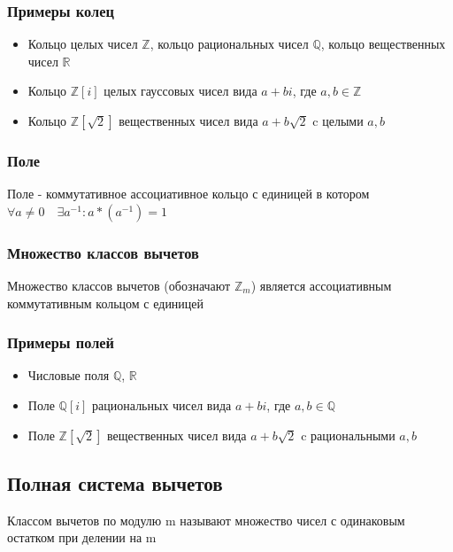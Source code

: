 \documentclass[12pt]{article}
\begin{document}
            \subsubsection{Примеры колец}
            \begin{itemize}
                \item Кольцо целых чисел $\mathbb{Z}$, кольцо рациональных чисел $\mathbb{Q}$, кольцо вещественных чисел $\mathbb{R}$
                \item Кольцо $\mathbb{Z}[i]$ целых гауссовых чисел вида $a + bi$, где $a,b \in \mathbb{Z}$
                \item Кольцо $\mathbb{Z}[\sqrt{2}]$ вещественных чисел вида $a + b\sqrt{2}$ c целыми $a,b$
            \end{itemize}

            \subsubsection{Поле}
            Поле - коммутативное ассоциативное кольцо с единицей в котором $\forall a \ne 0 \quad \exists a^{-1}: a * (a^{-1}) = 1$

            \subsubsection{Множество классов вычетов}
            Множество классов вычетов (обозначают $\mathbb{Z}_m$) является ассоциативным коммутативным кольцом с единицей
            \subsubsection{Примеры полей}
            \begin{itemize}
                \item Числовые поля $\mathbb{Q}$, $\mathbb{R}$
                \item Поле $\mathbb{Q}[i]$ рациональных чисел вида $a + bi$, где $a,b \in \mathbb{Q}$
                \item Поле $\mathbb{Z}[\sqrt{2}]$ вещественных чисел вида $a + b\sqrt{2}$ c рациональными $a,b$
            \end{itemize}

            \subsection{Полная система вычетов}

            Классом вычетов по модулю m называют множество чисел с одинаковым остатком при делении на m
\end{document}
